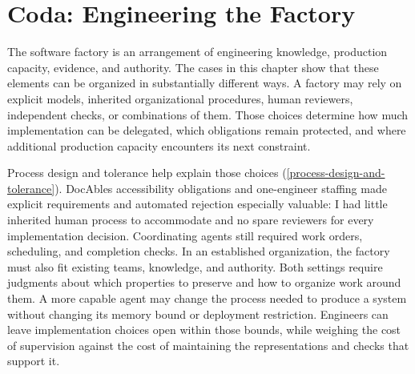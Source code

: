 




\chapter{Coda: Engineering the Factory}


The software factory is an arrangement of engineering knowledge, production capacity, evidence, and authority. The cases in this chapter show that these elements can be organized in substantially different ways. A factory may rely on explicit models, inherited organizational procedures, human reviewers, independent checks, or combinations of them. Those choices determine how much implementation can be delegated, which obligations remain protected, and where additional production capacity encounters its next constraint.


Process design and tolerance help explain those choices (\autoref{process-design-and-tolerance}). DocAble\textquotesingle s accessibility obligations and one-engineer staffing made explicit requirements and automated rejection especially valuable: I had little inherited human process to accommodate and no spare reviewers for every implementation decision. Coordinating agents still required work orders, scheduling, and completion checks. In an established organization, the factory must also fit existing teams, knowledge, and authority. Both settings require judgments about which properties to preserve and how to organize work around them. A more capable agent may change the process needed to produce a system without changing its memory bound or deployment restriction. Engineers can leave implementation choices open within those bounds, while weighing the cost of supervision against the cost of maintaining the representations and checks that support it.

